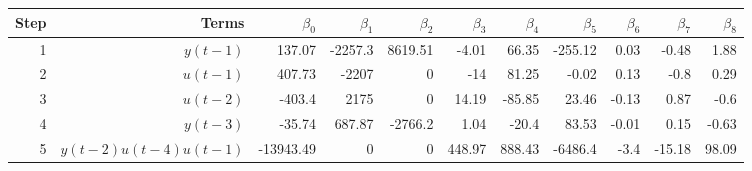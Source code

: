 \begin{tabular}{rrrrrrrrrrr}
Step & Terms & $\beta_{0}$ & $\beta_{1}$ & $\beta_{2}$ & $\beta_{3}$ & $\beta_{4}$ & $\beta_{5}$ & $\beta_{6}$ & $\beta_{7}$ & $\beta_{8}$ \\ 
\hline 
1 & $y(t-1)$ & 137.07 & -2257.3 & 8619.51 & -4.01 & 66.35 & -255.12 & 0.03 & -0.48 & 1.88 \\ 
2 & $u(t-1)$ & 407.73 & -2207 & 0 & -14 & 81.25 & -0.02 & 0.13 & -0.8 & 0.29 \\ 
3 & $u(t-2)$ & -403.4 & 2175 & 0 & 14.19 & -85.85 & 23.46 & -0.13 & 0.87 & -0.6 \\ 
4 & $y(t-3)$ & -35.74 & 687.87 & -2766.2 & 1.04 & -20.4 & 83.53 & -0.01 & 0.15 & -0.63 \\ 
5 & $y(t-2)u(t-4)u(t-1)$ & -13943.49 & 0 & 0 & 448.97 & 888.43 & -6486.4 & -3.4 & -15.18 & 98.09 \\ 
\hline 
\end{tabular}